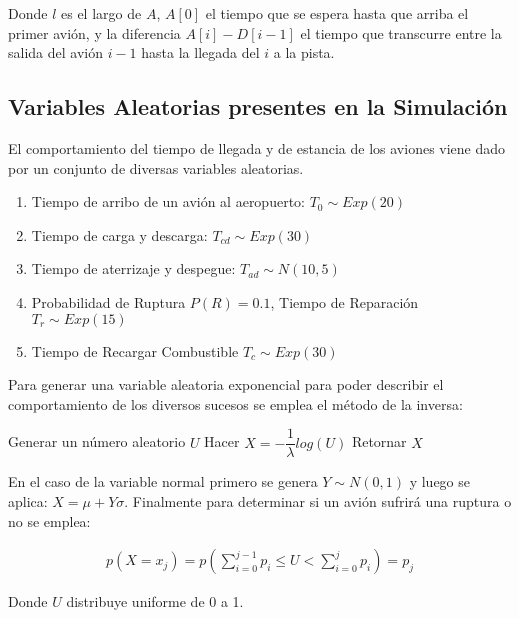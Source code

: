 \documentclass[a4paper,10pt,twocolumn]{article}
\begin{document}
	Donde $l$ es el largo de $A$, $A[0]$ el tiempo que se espera hasta que arriba el primer avi\'on, y 
	la diferencia $A[i] - D[i-1]$ el tiempo que transcurre entre la salida del avi\'on $i-1$ hasta la llegada
	del $i$ a la pista.

	\subsection{Variables Aleatorias presentes en la Simulaci\'on}\label{sub:lists}
		
		El comportamiento del tiempo de llegada y de estancia de los aviones viene dado
		por un conjunto de diversas variables aleatorias.
		
		\begin{enumerate}
			\item Tiempo de arribo de un avi\'on al aeropuerto: $T_{0} \sim  Exp(20)$
			\item Tiempo de carga y descarga: $T_{cd} \sim Exp(30)$
			\item Tiempo de aterrizaje y despegue: $T_{ad} \sim N(10,5)$
			\item Probabilidad de Ruptura $P(R) = 0.1$, Tiempo de Reparaci\'on $T_{r} \sim Exp(15)$
			\item Tiempo de Recargar Combustible $T_{c} \sim Exp(30)$ 
		\end{enumerate}

		Para generar una variable aleatoria exponencial para poder describir el comportamiento de los diversos sucesos se emplea el m\'etodo de la inversa:
		
		\begin{algorithmic}[1]
			\STATE Generar un n\'umero aleatorio $U$
			\STATE Hacer $X = - \dfrac{1}{\lambda} log(U)$ 
			\STATE Retornar $X$
		\end{algorithmic}

		En el caso de la variable normal primero se genera $Y \sim N(0,1)$ y luego se aplica: $X = \mu + Y\sigma$. Finalmente para determinar si un avi\'on sufrir\'a una ruptura o no se emplea:
		
		\begin{align*}
			p\left(X = x_{j}\right) = p\left(\sum_{i=0}^{j-1} p_{i} \leq U < \sum_{i=0}^{j}p_{i} \right) = p_{j}
		\end{align*}

		Donde $U$ distribuye uniforme de 0 a 1. 
\end{document}
